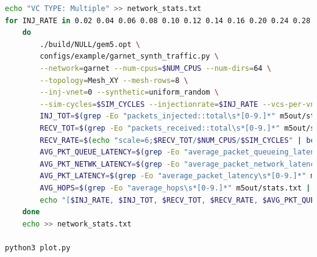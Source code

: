 \documentclass{article}
\begin{document}
\begin{lstlisting}[language=bash]
echo "VC TYPE: Multiple" >> network_stats.txt
for INJ_RATE in 0.02 0.04 0.06 0.08 0.10 0.12 0.14 0.16 0.20 0.24 0.28 0.32 0.40 0.48 0.56 0.64 0.72 0.80
	do
		./build/NULL/gem5.opt \
		configs/example/garnet_synth_traffic.py \
		--network=garnet --num-cpus=$NUM_CPUS --num-dirs=64 \
		--topology=Mesh_XY --mesh-rows=8 \
		--inj-vnet=0 --synthetic=uniform_random \
		--sim-cycles=$SIM_CYCLES --injectionrate=$INJ_RATE --vcs-per-vnet=16
		INJ_TOT=$(grep -Eo "packets_injected::total\s*[0-9.]*" m5out/stats.txt | grep -Eo "[0-9.]*")
		RECV_TOT=$(grep -Eo "packets_received::total\s*[0-9.]*" m5out/stats.txt | grep -Eo "[0-9.]*")
		RECV_RATE=$(echo "scale=6;$RECV_TOT/$NUM_CPUS/$SIM_CYCLES" | bc)
		AVG_PKT_QUEUE_LATENCY=$(grep -Eo "average_packet_queueing_latency\s*[0-9.]*" m5out/stats.txt | grep -Eo "[0-9.]*")
		AVG_PKT_NETWK_LATENCY=$(grep -Eo "average_packet_network_latency\s*[0-9.]*" m5out/stats.txt | grep -Eo "[0-9.]*")
		AVG_PKT_LATENCY=$(grep -Eo "average_packet_latency\s*[0-9.]*" m5out/stats.txt | grep -Eo "[0-9.]*")
		AVG_HOPS=$(grep -Eo "average_hops\s*[0-9.]*" m5out/stats.txt | grep -Eo "[0-9.]*")
		echo "[$INJ_RATE, $INJ_TOT, $RECV_TOT, $RECV_RATE, $AVG_PKT_QUEUE_LATENCY, $AVG_PKT_NETWK_LATENCY, $AVG_PKT_LATENCY, $AVG_HOPS]" >> network_stats.txt
	done
	echo >> network_stats.txt

python3 plot.py
\end{lstlisting}
\end{document}
